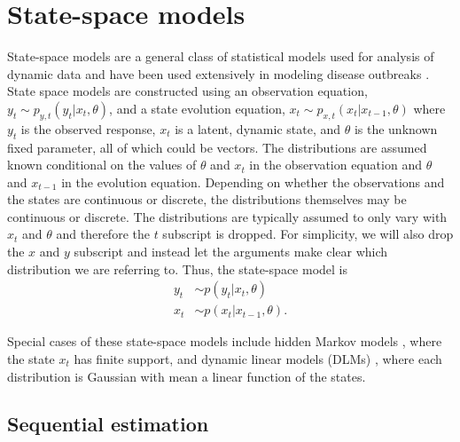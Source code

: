 \documentclass{elsarticle}
\begin{document}
\section{State-space models \label{sec:ss}}

State-space models are a general class of statistical models used for analysis of dynamic data and have been used extensively in modeling disease outbreaks \citep{Mart:Cone:Lope:Lope:baye:2008,watkins2009disease,merl2009statistical,ludkovski2010optimal,skvortsov2012monitoring}.  State space models are constructed using an observation equation, $y_t \sim p_{y,t}(y_t|x_t,\theta)$, and a state evolution equation, $x_t \sim p_{x,t}(x_t|x_{t-1},\theta)$ where $y_t$ is the observed response, $x_t$ is a latent, dynamic state, and $\theta$ is the unknown fixed parameter, all of which could be vectors. The distributions are assumed known conditional on the values of $\theta$ and $x_t$ in the observation equation and $\theta$ and $x_{t-1}$ in the evolution equation. Depending on whether the observations and the states are continuous or discrete, the distributions themselves may be continuous or discrete. The distributions are typically assumed to only vary with $x_t$ and $\theta$ and therefore the $t$ subscript is dropped.
For simplicity, we will also drop the $x$ and $y$ subscript and instead let the arguments make clear which distribution we are referring to. Thus, the state-space model is
\begin{align*}
y_t &\sim p(y_t|x_t,\theta) \\
x_t &\sim p(x_t|x_{t-1},\theta).
\end{align*}

Special cases of these state-space models include hidden Markov models \citep{cappe2005inference}, where the state $x_t$ has finite support, and dynamic linear models (DLMs) \citep{West:Harr:baye:1997}, where each distribution is Gaussian with mean a linear function of the states.

\subsection{Sequential estimation \label {sec:sequential}}
\end{document}
